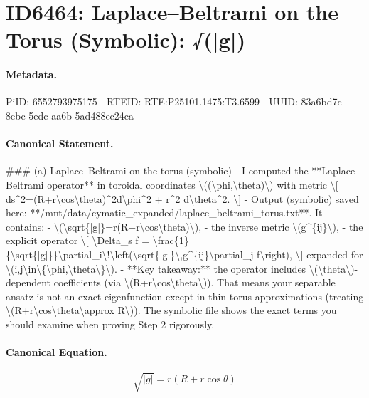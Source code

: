 \section*{ID6464: Laplace–Beltrami on the Torus (Symbolic): √(|g|)}
\paragraph{Metadata.}
PiID: 6552793975175 | RTEID: RTE:P25101.1475:T3.6599 | UUID: 83a6bd7c-8ebc-5edc-aa6b-5ad488ec24ca

\paragraph{Canonical Statement.}
\#\#\# (a) Laplace–Beltrami on the torus (symbolic) - I computed the **Laplace–Beltrami operator** in toroidal coordinates \textbackslash{}((\textbackslash{}phi,\textbackslash{}theta)\textbackslash{}) with metric \textbackslash{}[ ds\textasciicircum{}2=(R+r\textbackslash{}cos\textbackslash{}theta)\textasciicircum{}2d\textbackslash{}phi\textasciicircum{}2 + r\textasciicircum{}2 d\textbackslash{}theta\textasciicircum{}2. \textbackslash{}] - Output (symbolic) saved here: **/mnt/data/cymatic\_expanded/laplace\_beltrami\_torus.txt**. It contains: - \textbackslash{}(\textbackslash{}sqrt\{|g|\}=r(R+r\textbackslash{}cos\textbackslash{}theta)\textbackslash{}), - the inverse metric \textbackslash{}(g\textasciicircum{}\{ij\}\textbackslash{}), - the explicit operator \textbackslash{}[ \textbackslash{}Delta\_s f = \textbackslash{}frac\{1\}\{\textbackslash{}sqrt\{|g|\}\}\textbackslash{}partial\_i\textbackslash{}!\textbackslash{}left(\textbackslash{}sqrt\{|g|\}\textbackslash{},g\textasciicircum{}\{ij\}\textbackslash{}partial\_j f\textbackslash{}right), \textbackslash{}] expanded for \textbackslash{}(i,j\textbackslash{}in\textbackslash{}\{\textbackslash{}phi,\textbackslash{}theta\textbackslash{}\}\textbackslash{}). - **Key takeaway:** the operator includes \textbackslash{}(\textbackslash{}theta\textbackslash{})-dependent coefficients (via \textbackslash{}(R+r\textbackslash{}cos\textbackslash{}theta\textbackslash{})). That means your separable ansatz is not an exact eigenfunction except in thin-torus approximations (treating \textbackslash{}(R+r\textbackslash{}cos\textbackslash{}theta\textbackslash{}approx R\textbackslash{})). The symbolic file shows the exact terms you should examine when proving Step 2 rigorously.

\paragraph{Canonical Equation.}
\[
\sqrt{|g|}=r(R+r\cos\theta)
\]

